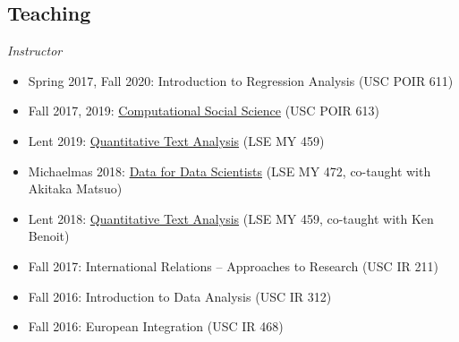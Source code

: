 \documentclass[margin,line,11pt]{resume}
\begin{document}
\begin{resume}
\newpage
            \section{\mysidestyle Teaching}

\emph{Instructor}
\begin{itemize}
\item Spring 2017, Fall 2020: Introduction to Regression Analysis (USC POIR 611)
\item Fall 2017, 2019: \href{http://pablobarbera.com/POIR613/}{Computational Social Science} (USC POIR 613)
\item Lent 2019: \href{https://lse-my459.github.io/}{Quantitative Text Analysis} (LSE MY 459)
\item Michaelmas 2018: \href{https://lse-my472.github.io/}{Data for Data Scientists} (LSE MY 472, co-taught with Akitaka Matsuo)
\item Lent 2018: \href{https://lse-my459.github.io/}{Quantitative Text Analysis} (LSE MY 459, co-taught with Ken Benoit)
\item Fall 2017: International Relations -- Approaches to Research (USC IR 211)
\item Fall 2016: Introduction to Data Analysis (USC IR 312)
\item Fall 2016: European Integration (USC IR 468)
\end{itemize}




\end{resume}
\end{document}
